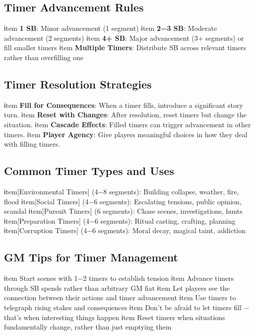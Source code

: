\documentclass[11pt]{article}
\begin{document}
\subsection*{Timer Advancement Rules}

\begin{itemize}[leftmargin=*]
ℹtem \textbf{1 SB}: Minor advancement (1 segment)
ℹtem \textbf{2−3 SB}: Moderate advancement (2 segments)  
ℹtem \textbf{4+ SB}: Major advancement (3+ segments) or fill smaller timers
ℹtem \textbf{Multiple Timers}: Distribute SB across relevant timers rather than overfilling one
\end{itemize}

\subsection*{Timer Resolution Strategies}

\begin{enumerate}[leftmargin=*]
ℹtem \textbf{Fill for Consequences}: When a timer fills, introduce a significant story turn.
ℹtem \textbf{Reset with Changes}: After resolution, reset timers but change the situation.
ℹtem \textbf{Cascade Effects}: Filled timers can trigger advancement in other timers.
ℹtem \textbf{Player Agency}: Give players meaningful choices in how they deal with filling timers.
\end{enumerate}

\subsection*{Common Timer Types and Uses}

\begin{description}[leftmargin=*]
ℹtem[Environmental Timers] (4−8 segments): Building collapse, weather, fire, flood
ℹtem[Social Timers] (4−6 segments): Escalating tensions, public opinion, scandal  
ℹtem[Pursuit Timers] (6 segments): Chase scenes, investigations, hunts
ℹtem[Preparation Timers] (4−6 segments): Ritual casting, crafting, planning
ℹtem[Corruption Timers] (4−6 segments): Moral decay, magical taint, addiction
\end{description}

\subsection*{GM Tips for Timer Management}

\begin{itemize}[leftmargin=*]
ℹtem Start scenes with 1−2 timers to establish tension
ℹtem Advance timers through SB spends rather than arbitrary GM fiat
ℹtem Let players see the connection between their actions and timer advancement
ℹtem Use timers to telegraph rising stakes and consequences
ℹtem Don't be afraid to let timers fill − that's when interesting things happen
ℹtem Reset timers when situations fundamentally change, rather than just emptying them
\end{itemize}
\end{document}
